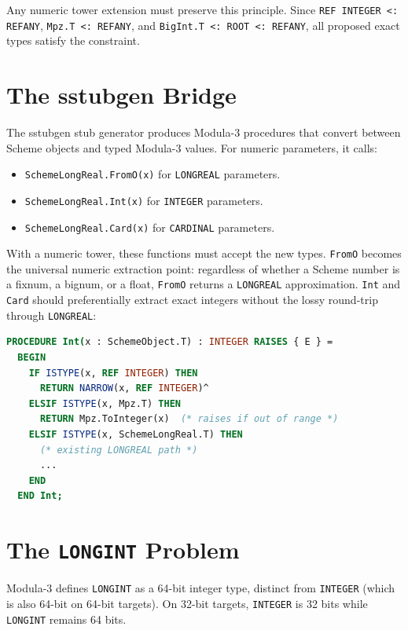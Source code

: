 \documentclass[12pt]{report}
\begin{document}
Any numeric tower extension must preserve this principle.  Since
{\tt REF INTEGER <: REFANY}, {\tt Mpz.T <: REFANY}, and
{\tt BigInt.T <: ROOT <: REFANY}, all proposed exact types satisfy
the constraint.

\section{The sstubgen Bridge}

The sstubgen stub generator produces Modula-3 procedures that convert
between Scheme objects and typed Modula-3 values.  For numeric parameters,
it calls:

\begin{itemize}
\item {\tt SchemeLongReal.FromO(x)} for {\tt LONGREAL} parameters.
\item {\tt SchemeLongReal.Int(x)} for {\tt INTEGER} parameters.
\item {\tt SchemeLongReal.Card(x)} for {\tt CARDINAL} parameters.
\end{itemize}

With a numeric tower, these functions must accept the new types.
{\tt FromO} becomes the universal numeric extraction point:
regardless of whether a Scheme number is a fixnum, a bignum, or a
float, {\tt FromO} returns a {\tt LONGREAL} approximation.
{\tt Int} and {\tt Card} should preferentially extract exact integers
without the lossy round-trip through {\tt LONGREAL}:

\begin{lstlisting}[language=Modula3]
PROCEDURE Int(x : SchemeObject.T) : INTEGER RAISES { E } =
  BEGIN
    IF ISTYPE(x, REF INTEGER) THEN
      RETURN NARROW(x, REF INTEGER)^
    ELSIF ISTYPE(x, Mpz.T) THEN
      RETURN Mpz.ToInteger(x)  (* raises if out of range *)
    ELSIF ISTYPE(x, SchemeLongReal.T) THEN
      (* existing LONGREAL path *)
      ...
    END
  END Int;
\end{lstlisting}

\section{The {\tt LONGINT} Problem}

Modula-3 defines {\tt LONGINT} as a 64-bit integer type, distinct
from {\tt INTEGER} (which is also 64-bit on 64-bit targets).  On
32-bit targets, {\tt INTEGER} is 32 bits while {\tt LONGINT} remains
64 bits.
\end{document}
